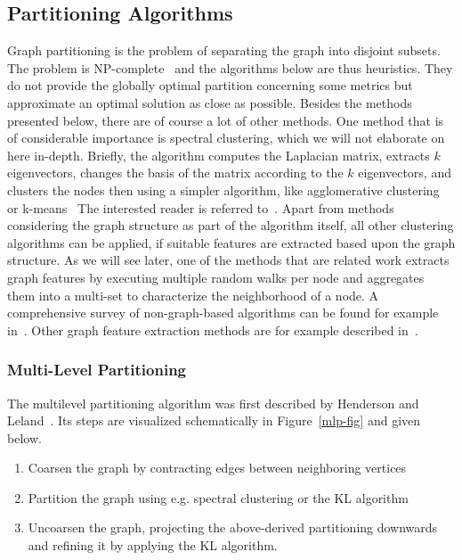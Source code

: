         \subsection{Partitioning Algorithms} 
            Graph partitioning is the problem of separating the graph into disjoint subsets. 
            The problem is NP-complete~\autocite{andreev2006balanced} and the algorithms below are thus heuristics.
            They do not provide the globally optimal partition concerning some metrics but approximate an optimal solution as close as possible.
            Besides the methods presented below, there are of course a lot of other methods.
            One method that is of considerable importance is spectral clustering, which we will not elaborate on here in-depth.
            Briefly, the algorithm computes the Laplacian matrix, extracts $k$ eigenvectors, changes the basis of the matrix according to the $k$ eigenvectors, and clusters the nodes then using a simpler algorithm, like agglomerative clustering~\autocite{hac} or k-means~\autocite{lloyd1982least}
            The interested reader is referred to~\autocite{spectral, uvl, ng}.
            Apart from methods considering the graph structure as part of the algorithm itself, all other clustering algorithms can be applied, if suitable features are extracted based upon the graph structure.
            As we will see later, one of the methods that are related work extracts graph features by executing multiple random walks per node and aggregates them into a multi-set to characterize the neighborhood of a node.
            A comprehensive survey of non-graph-based algorithms can be found for example in~\autocite{overview_clust, berkhin2006survey, xu2005survey, han2011data}.
            Other graph feature extraction methods are for example described in~\autocite{neumann2011characteristic, henderson2011s, henderson2012rolx}.
            
            
            
            \subsubsection*{Multi-Level Partitioning}\label{mlp}
                The multilevel partitioning algorithm was first described by Henderson and Leland~\autocite{hendrickson1995multi}. 
                Its steps are visualized schematically in Figure~\ref{mlp-fig} and given below.
                \begin{enumerate}
                    \item Coarsen the graph by contracting edges between neighboring vertices
                    \item Partition the graph using e.g. spectral clustering or the KL algorithm
                    \item Uncoarsen the graph, projecting the above-derived partitioning downwards and refining it by applying the KL algorithm.
                \end{enumerate}
                
